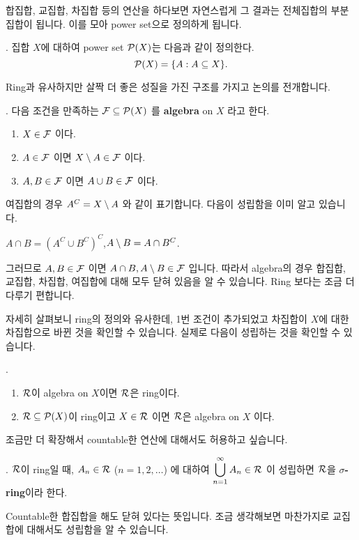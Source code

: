 합집합, 교집합, 차집합 등의 연산을 하다보면 자연스럽게 그 결과는 전체집합의 부분집합이 됩니다. 이를 모아 power set으로 정의하게 됩니다.

.  집합 \(X\)에 대하여 power set \(\mathcal{P}(X)\)는 다음과 같이 정의한다.
\[
    \mathcal{P}(X) = \{A : A \subseteq X\}.
\]

Ring과 유사하지만 살짝 더 좋은 성질을 가진 구조를 가지고 논의를 전개합니다.

.  다음 조건을 만족하는 \(\mathcal{F} \subseteq \mathcal{P}(X)\) 를 \textbf{algebra} on \(X\) 라고 한다.
\begin{enumerate}
    \item \(X \in \mathcal{F}\) 이다.
    \item \(A \in \mathcal{F}\) 이면 \(X \setminus A \in \mathcal{F}\) 이다.
    \item \(A, B \in \mathcal{F}\) 이면 \(A\cup B \in \mathcal{F}\) 이다.
\end{enumerate}

\rmk 여집합의 경우 \(A^C = X \setminus A\) 와 같이 표기합니다. 다음이 성립함을 이미 알고 있습니다.
\begin{center}
    \(A \cap B = (A^C \cup B^C)^C\),\quad \(A\setminus B = A \cap B^C\).
\end{center}

그러므로 \(A, B \in \mathcal{F}\) 이면 \(A \cap B, A \setminus B \in \mathcal{F}\) 입니다. 따라서 algebra의 경우 합집합, 교집합, 차집합, 여집합에 대해 모두 닫혀 있음을 알 수 있습니다. Ring 보다는 조금 더 다루기 편합니다.

자세히 살펴보니 ring의 정의와 유사한데, 1번 조건이 추가되었고 차집합이 \(X\)에 대한 차집합으로 바뀐 것을 확인할 수 있습니다. 실제로 다음이 성립하는 것을 확인할 수 있습니다.

\prop.
\begin{enumerate}
    \item \(\mathcal{R}\)이 algebra on \(X\)이면 \(\mathcal{R}\)은 ring이다.
    \item \(\mathcal{R} \subseteq \mathcal{P}(X)\)이 ring이고 \(X \in \mathcal{R}\) 이면 \(\mathcal{R}\)은 algebra on \(X\) 이다.
\end{enumerate}

조금만 더 확장해서 countable한 연산에 대해서도 허용하고 싶습니다.

.  \(\mathcal{R}\)이 ring일 때, \(A_n \in \mathcal{R}\) (\(n = 1, 2, \dots\)) 에 대하여 \(\displaystyle \bigcup_{n=1}^\infty A_n \in \mathcal{R}\) 이 성립하면 \(\mathcal{R}\)을 \textbf{\(\sigma\)-ring}이라 한다.

Countable한 합집합을 해도 닫혀 있다는 뜻입니다. 조금 생각해보면 마찬가지로 교집합에 대해서도 성립함을 알 수 있습니다.

